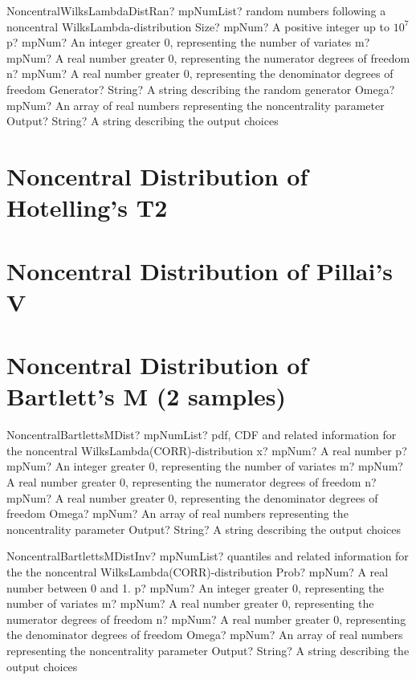 \documentclass[12pt,a4paper,openany]{book}
\begin{document}
\begin{mpFunctionsExtract}
\mpFunctionSevenNotImplemented
{NoncentralWilksLambdaDistRan? mpNumList? random numbers following a noncentral WilksLambda-distribution}
{Size? mpNum? A positive integer up to $10^7$}
{p? mpNum? An integer greater 0, representing the number of variates}
{m? mpNum? A real number greater 0, representing the numerator  degrees of freedom}
{n? mpNum? A real number greater 0, representing the denominator degrees of freedom}
{Generator? String? A string describing the random generator}
{Omega? mpNum? An array of real numbers representing the noncentrality parameter}
{Output? String? A string describing the output choices}
\end{mpFunctionsExtract}

\section{Noncentral Distribution of Hotelling's T2}

\section{Noncentral Distribution of Pillai's V}

\section{Noncentral Distribution of Bartlett's M (2 samples)}

\begin{mpFunctionsExtract}
\mpFunctionSixNotImplemented
{NoncentralBartlettsMDist? mpNumList? pdf, CDF and related information for the noncentral WilksLambda(CORR)-distribution}
{x? mpNum? A real number}
{p? mpNum? An integer greater 0, representing the number of variates}
{m? mpNum? A real number greater 0, representing the numerator  degrees of freedom}
{n? mpNum? A real number greater 0, representing the denominator degrees of freedom}
{Omega? mpNum? An array of real numbers representing the noncentrality parameter}
{Output? String? A string describing the output choices}
\end{mpFunctionsExtract}

\begin{mpFunctionsExtract}
\mpFunctionSixNotImplemented
{NoncentralBartlettsMDistInv? mpNumList? quantiles and related information for the the noncentral WilksLambda(CORR)-distribution}
{Prob? mpNum? A real number between 0 and 1.}
{p? mpNum? An integer greater 0, representing the number of variates}
{m? mpNum? A real number greater 0, representing the numerator  degrees of freedom}
{n? mpNum? A real number greater 0, representing the denominator degrees of freedom}
{Omega? mpNum? An array of real numbers representing the noncentrality parameter}
{Output? String? A string describing the output choices}
\end{mpFunctionsExtract}
\end{document}
